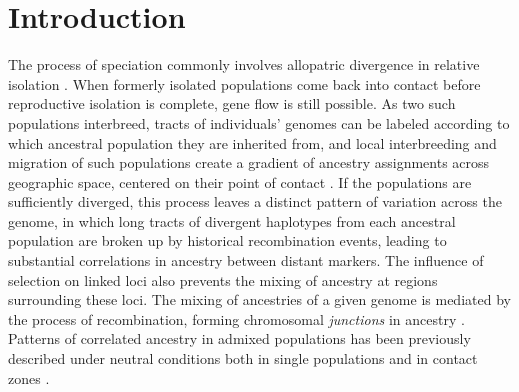 \documentclass[11pt,letterpaper]{article}
\newcommand{\plr}[1]{{\em \color{blue} #1}}
\begin{document}
\linenumbers
\doublespacing



\section*{Introduction}


The process of speciation commonly involves allopatric divergence in relative isolation \citep{Coyne2004}.  
When formerly isolated populations come back into contact 
before reproductive isolation is complete, gene flow is still possible. 
As two such populations interbreed, tracts of
individuals' genomes can be labeled according to which ancestral population they are inherited from,
and local interbreeding and migration of such populations
create a gradient of ancestry assignments across geographic space,
centered on their point of contact \citep{Barton1985}. 
If the populations are sufficiently diverged,
this process leaves a distinct pattern of variation across the genome, 
in which long tracts of divergent haplotypes from each ancestral population  
are broken up by historical recombination events,
leading to substantial correlations in ancestry between distant markers.
The influence of selection on linked loci also prevents the mixing of ancestry at regions surrounding these loci. %
The mixing of ancestries of a given genome is mediated by 
the process of recombination, forming chromosomal \emph{junctions} in ancestry \citep{Fisher1954, Chapman2002, Baird2003}.   
Patterns of correlated ancestry in admixed populations has been previously described under neutral conditions both in single populations and in contact zones \citep[e.g.][]{Gravel2012,Hellenthal2014,Sedghifar2015}.  
\end{document}
